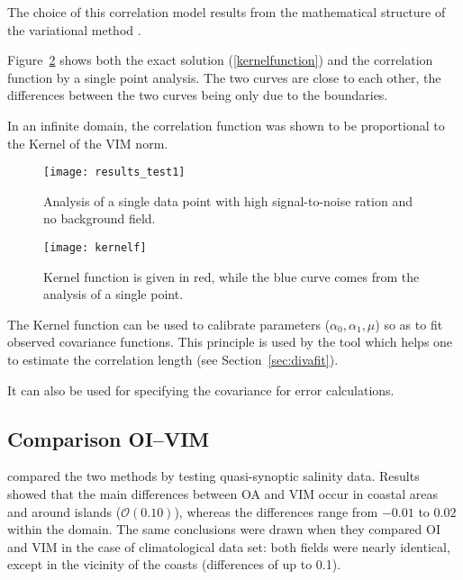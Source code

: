 The choice of this correlation model results from the mathematical structure of the variational method \citep{BRASSEUR96}.

Figure~\ref{kernel1} shows both the exact solution (\ref{kernelfunction}) and the correlation function by a single point analysis. The two curves are close to each other, the differences between the two curves being only due to the boundaries.

In an infinite domain, the correlation function was shown to be proportional to the Kernel of the VIM norm.

\begin{figure}[H]
\centering
\texttt{[image: results\_test1]}
\caption{Analysis of a single data point with high signal-to-noise ration and no background field.\label{singleanalysis}}
\end{figure}

\begin{figure}[H]
\centering
\texttt{[image: kernelf]}
\caption{Kernel function is given in red, while the blue curve comes from the analysis of a single point.\label{kernel1}}
\end{figure}


The Kernel function can be used to calibrate \diva parameters ($\alpha_0, \alpha_1, \mu$) so as to fit observed covariance functions. This principle is used by the tool  which helps one to estimate the correlation length (see Section~\ref{sec:divafit}).

It can also be used for specifying the covariance for error calculations.%





\subsection{Comparison OI--VIM}

\citet{RIXEN00} compared the two methods by testing quasi-synoptic salinity data. Results showed that the main differences between OA and VIM occur in coastal areas and around islands ($\mathcal{O}(0.10)$), whereas the differences range from $-0.01$ to $0.02$ within the domain. The same conclusions were drawn when they compared OI and VIM in the case of climatological data set: both fields were nearly identical, except in the vicinity of the coasts (differences of up to 0.1).

